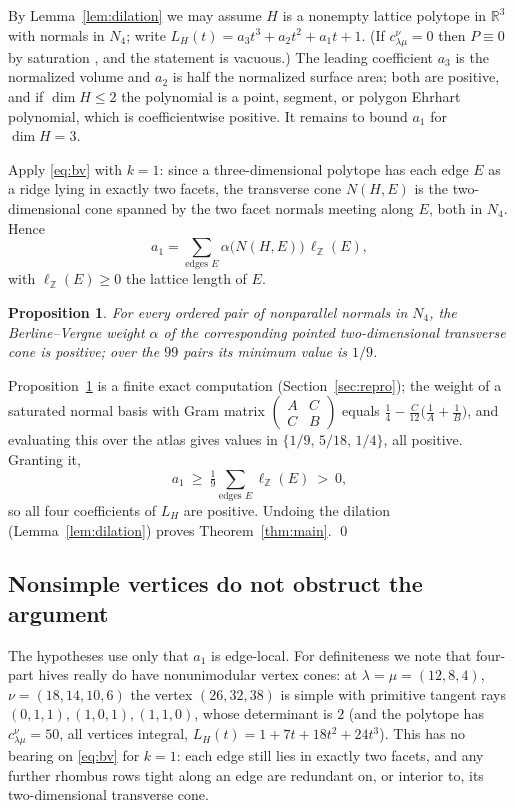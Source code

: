 \documentclass[11pt]{amsart}
\newtheorem{proposition}[theorem]{Proposition}
\theoremstyle{definition}
\newcommand{\Z}{\mathbb{Z}}
\newcommand{\R}{\mathbb{R}}
\newcommand{\lam}{\lambda}
\begin{document}
By Lemma~\ref{lem:dilation} we may assume $H$ is a nonempty lattice polytope in
$\R^{3}$ with normals in $N_4$; write $L_H(t)=a_3t^3+a_2t^2+a_1t+1$. (If
$c^{\nu}_{\lam\mu}=0$ then $P\equiv 0$ by saturation \cite{KnutsonTao}, and the
statement is vacuous.) The leading coefficient $a_3$ is the normalized volume
and $a_2$ is half the normalized surface area; both are positive, and if
$\dim H\le 2$ the polynomial is a point, segment, or polygon Ehrhart polynomial,
which is coefficientwise positive. It remains to bound $a_1$ for
$\dim H=3$.

Apply \eqref{eq:bv} with $k=1$: since a three-dimensional polytope has each edge
$E$ as a ridge lying in exactly two facets, the transverse cone $N(H,E)$ is the
two-dimensional cone spanned by the two facet normals meeting along $E$, both in
$N_4$. Hence
\[
  a_1=\sum_{\text{edges }E}\alpha\bigl(N(H,E)\bigr)\,\ell_{\Z}(E),
\]
with $\ell_{\Z}(E)\ge 0$ the lattice length of $E$.

\begin{proposition}\label{prop:codim2}
For every ordered pair of nonparallel normals in $N_4$, the Berline--Vergne
weight $\alpha$ of the corresponding pointed two-dimensional transverse cone is
positive; over the $99$ pairs its minimum value is $1/9$.
\end{proposition}

Proposition~\ref{prop:codim2} is a finite exact computation
(Section~\ref{sec:repro}); the weight of a saturated normal basis with Gram
matrix $\left(\begin{smallmatrix}A&C\\ C&B\end{smallmatrix}\right)$ equals
$\tfrac14-\tfrac{C}{12}\bigl(\tfrac1A+\tfrac1B\bigr)$, and evaluating this over
the atlas gives values in $\{1/9,\,5/18,\,1/4\}$, all positive. Granting it,
\[
  a_1\ \ge\ \tfrac19\sum_{\text{edges }E}\ell_{\Z}(E)\ >\ 0,
\]
so all four coefficients of $L_H$ are positive. Undoing the dilation
(Lemma~\ref{lem:dilation}) proves Theorem~\ref{thm:main}. \qed

\subsection{Nonsimple vertices do not obstruct the argument}\label{sec:nonsimple}
The hypotheses use only that $a_1$ is edge-local. For definiteness we note that
four-part hives really do have nonunimodular vertex cones: at
$\lam=\mu=(12,8,4)$, $\nu=(18,14,10,6)$ the vertex $(26,32,38)$ is simple with
primitive tangent rays $(0,1,1),(1,0,1),(1,1,0)$, whose determinant is $2$
(and the polytope has $c^{\nu}_{\lam\mu}=50$, all vertices integral,
$L_H(t)=1+7t+18t^2+24t^3$). This has no bearing on \eqref{eq:bv} for $k=1$: each
edge still lies in exactly two facets, and any further rhombus rows tight along
an edge are redundant on, or interior to, its two-dimensional transverse cone.
\end{document}
